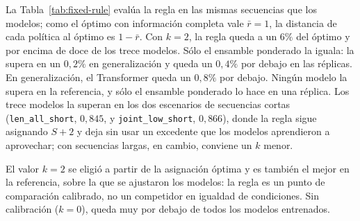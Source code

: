 \documentclass[../00_Main/Main.tex]{subfiles}
\begin{document}
La Tabla~\ref{tab:fixed-rule} eval\'ua la regla en las mismas secuencias
que los modelos; como el \'optimo con informaci\'on completa vale
$\bar r = 1$, la distancia de cada pol\'itica al \'optimo es $1 - \bar r$. Con $k = 2$, la
regla queda a un $6\%$ del \'optimo y por encima de doce de los trece
modelos. S\'olo el ensamble ponderado la iguala: la supera en un $0{,}2\%$
en generalizaci\'on y queda un $0{,}4\%$ por debajo en las r\'eplicas. En
generalizaci\'on, el Transformer queda un $0{,}8\%$ por debajo. Ning\'un modelo la supera en la referencia, y s\'olo el
ensamble ponderado lo hace en una r\'eplica. Los trece modelos la superan en los dos
escenarios de secuencias cortas (\texttt{len\_all\_short}, $0{,}845$, y
\texttt{joint\_low\_short}, $0{,}866$), donde la regla sigue asignando
$S + 2$ y deja sin usar un excedente que los modelos aprendieron a
aprovechar; con secuencias largas, en cambio, conviene un $k$ menor.

El valor $k = 2$
se eligi\'o a partir de la asignaci\'on \'optima y es tambi\'en el mejor
en la referencia, sobre la que se ajustaron los modelos: la regla es un
punto de comparaci\'on calibrado, no un competidor en igualdad de
condiciones. Sin calibraci\'on ($k = 0$), queda muy por debajo de todos
los modelos entrenados.
\end{document}
